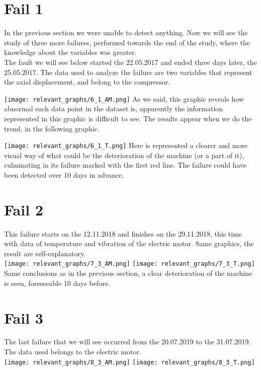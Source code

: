 \documentclass[
]{article}
\begin{document}
\hypertarget{fail-1}{%
\section{Fail 1}\label{fail-1}}

In the previous section we were unable to detect anything. Now we will
see the study of three more failures, performed towards the end of the
study, where the knowledge about the variables was greater.\\
The fault we will see below started the 22.05.2017 and ended three days
later, the 25.05.2017. The data used to analyze the failure are two
variables that represent the axial displacement, and belong to the
compressor.

\texttt{[image: relevant\_graphs/6\_1\_AM.png]} As we said, this graphic
reveals how abnormal each data point in the dataset is, apparently the
information represented in this graphic is difficult to see. The results
appear when we do the trend, in the following graphic.

\texttt{[image: relevant\_graphs/6\_1\_T.png]} Here is represented a
clearer and more visual way of what could be the deterioration of the
machine (or a part of it), culminating in its failure marked with the
first red line. The failure could have been detected over 10 days in
advance.

\hypertarget{fail-2}{%
\section{Fail 2}\label{fail-2}}

This failure starts on the 12.11.2018 and finishes on the 29.11.2018,
this time with data of temperature and vibration of the electric motor.
Same graphics, the result are self-explanatory.\\
\texttt{[image: relevant\_graphs/7\_3\_AM.png]}
\texttt{[image: relevant\_graphs/7\_3\_T.png]} Same conclusions as in the
previous section, a clear deterioration of the machine is seen,
foreseeable 10 days before.

\hypertarget{fail-3}{%
\section{Fail 3}\label{fail-3}}

The last failure that we will see occurred from the 20.07.2019 to the
31.07.2019. The data used belongs to the electric motor.\\
\texttt{[image: relevant\_graphs/8\_3\_AM.png]}
\texttt{[image: relevant\_graphs/8\_3\_T.png]}
\end{document}
